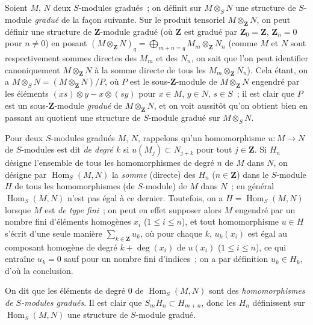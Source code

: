 \begin{env}[2.1.2]
\label{II.2.1.2-fr}
Soient $M$, $N$ deux $S$-modules gradués~; on définit sur $M\otimes_S N$ une
structure de $S$-module \emph{gradué} de la façon suivante. Sur le produit
tensoriel $M\otimes_{\mathbf{Z}}N$, on peut définir une structure de
$\mathbf{Z}$-module gradué (où $\mathbf{Z}$ est gradué par
$\mathbf{Z}_0=\mathbf{Z}$, $\mathbf{Z}_n=0$ pour $n\ne0$) en posant
$(M\otimes_{\mathbf{Z}}N)_q=\bigoplus_{m+n=q}M_m\otimes_{\mathbf{Z}}N_n$
(comme $M$ et $N$ sont respectivement sommes directes des $M_m$ et des
$N_n$, on sait que l'on peut identifier canoniquement
$M\otimes_{\mathbf{Z}}N$ à la somme directe de tous les
$M_m\otimes_{\mathbf{Z}}N_n$). Cela étant, on a
$M\otimes_S N=(M\otimes_{\mathbf{Z}}N)/P$, où $P$ est le
sous-$\mathbf{Z}$-module de $M\otimes_{\mathbf{Z}}N$ engendré par les
éléments $(xs)\otimes y-x\otimes(sy)$ pour $x\in M$, $y\in N$, $s\in S$~;
il est clair que $P$ est un sous-$\mathbf{Z}$-module \emph{gradué} de
$M\otimes_{\mathbf{Z}}N$, et on voit aussitôt qu'on obtient bien en passant
au quotient une structure de $S$-module gradué sur $M\otimes_S N$.

Pour deux $S$-modules gradués $M$, $N$, rappelons qu'un homomorphisme
$u:M\to N$ de $S$-modules est dit \emph{de degré $k$} si
$u(M_j)\subset N_{j+k}$ pour tout $j\in\mathbf{Z}$. Si $H_n$ désigne
l'ensemble de tous les homomorphismes de degré $n$ de $M$ dans $N$, on
désigne par $\operatorname{Hom}_S(M,N)$ la \emph{somme} (directe) des $H_n$
($n\in\mathbf{Z}$) dans le $S$-module $H$ de tous les homomorphismes (de
$S$-module) de $M$ dans $N$~; en général $\operatorname{Hom}_S(M,N)$ n'est
pas égal à ce dernier. Toutefois, on a $H=\operatorname{Hom}_S(M,N)$ lorsque
$M$ est \emph{de type fini}~; on peut en effet supposer alors $M$ engendré
par un nombre fini d'éléments homogènes $x_i$ ($1\leq i\leq n$), et tout
homomorphisme $u\in H$ s'écrit d'une seule manière
$\sum_{k\in\mathbf{Z}}u_k$, où pour chaque $k$, $u_k(x_i)$ est égal au
composant homogène de degré $k+\deg(x_i)$ de $u(x_i)$ ($1\leq i\leq n$), ce
qui entraîne $u_k=0$ sauf pour un nombre fini d'indices~; on a par définition
$u_k\in H_k$, d'où la conclusion.

On dit que les éléments de degré $0$ de $\operatorname{Hom}_S(M,N)$ sont des
\emph{homomorphismes de $S$-modules gradués}. Il est clair que
$S_mH_n\subset H_{m+n}$, donc les $H_n$ définissent sur
$\operatorname{Hom}_S(M,N)$ une structure de $S$-module gradué.


\end{env}
